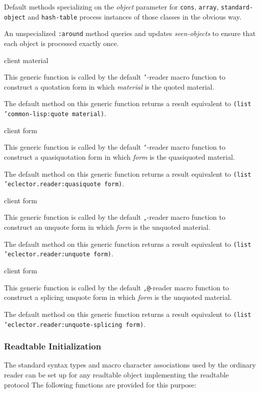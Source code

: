Default methods specializing on the \textit{object} parameter for
\texttt{cons}, \texttt{array}, \texttt{standard-object} and
\texttt{hash-table} process instances of those classes in the obvious
way.

An unspecialized \texttt{:around} method queries and updates
\textit{seen-objects} to ensure that each object is processed exactly
once.

 {client material}

This generic function is called by the default \texttt{'}-reader macro
function to construct a quotation form in which \textit{material} is
the quoted material.

The default method on this generic function returns a result
equivalent to \texttt{(list 'common-lisp:quote material)}.

 {client form}

This generic function is called by the default \texttt{`}-reader macro
function to construct a quasiquotation form in which \textit{form} is
the quasiquoted material.

The default method on this generic function returns a result
equivalent to \texttt{(list 'eclector.reader:quasiquote form)}.

 {client form}

This generic function is called by the default \texttt{,}-reader macro
function to construct an unquote form in which \textit{form} is the
unquoted material.

The default method on this generic function returns a result
equivalent to \texttt{(list 'eclector.reader:unquote form)}.

 {client form}

This generic function is called by the default \texttt{,@}-reader
macro function to construct a splicing unquote form in which
\textit{form} is the unquoted material.

The default method on this generic function returns a result
equivalent to \texttt{(list 'eclector.reader:unquote-splicing form)}.

\subsubsection{Readtable Initialization}
\label{sec:readtable-initialization}

The standard syntax types and macro character associations used by the
ordinary reader can be set up for any readtable object implementing
the readtable protocol   The following
functions are provided for this purpose:

